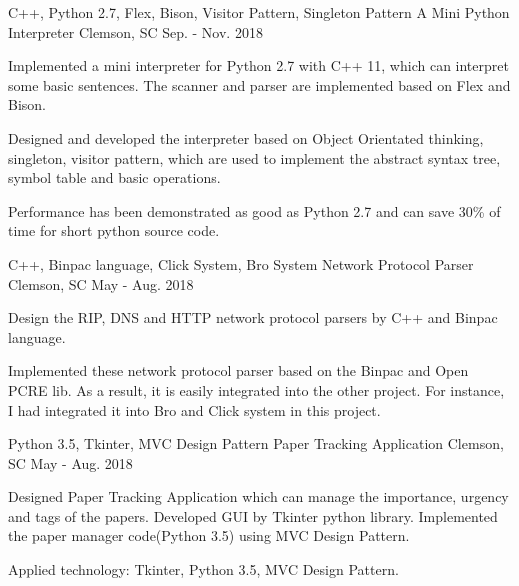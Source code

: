 \begin{cventries}
  \cventry
    {C++, Python 2.7, Flex, Bison, Visitor Pattern, Singleton Pattern} %
    {A Mini Python Interpreter} %
    {Clemson, SC} %
    {Sep. - Nov. 2018} %
    {
      \begin{cvitems} %
        \item {Implemented a mini interpreter for Python 2.7 with C++ 11, which can interpret some basic sentences. The scanner and parser are implemented based on Flex and Bison.}
        \item {Designed and developed the interpreter based on Object Orientated thinking, singleton, visitor pattern, which are used to implement the abstract syntax tree, symbol table and basic operations.}
        \item {Performance has been demonstrated as good as Python 2.7 and can save 30\% of time for short python source code.}
      \end{cvitems}
    }



 
  \cventry
    {C++, Binpac language, Click System, Bro System} %
    {Network Protocol Parser} %
    {Clemson, SC} %
    {May - Aug. 2018} %
    {
      \begin{cvitems} %
        \item  {Design the RIP, DNS and HTTP network protocol parsers by C++ and Binpac language.}
        \item {Implemented these network protocol parser based on the Binpac and Open PCRE lib. As a result, it is easily integrated into the other project. For instance, I had integrated it into Bro and Click system in this project.}
      \end{cvitems}
    }

  \cventry
    {Python 3.5, Tkinter, MVC Design Pattern} %
    {Paper Tracking Application} %
    {Clemson, SC} %
    {May - Aug. 2018}%
    {
      \begin{cvitems} %
        \item{Designed Paper Tracking Application which can manage the importance, urgency and tags of the papers. Developed GUI by Tkinter python library. Implemented the paper manager code(Python 3.5) using MVC Design Pattern.}
        \item {Applied technology: Tkinter, Python 3.5, MVC Design Pattern.}
      \end{cvitems}
    }


\end{cventries}

